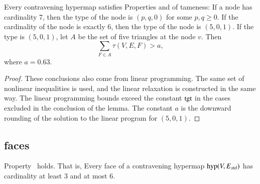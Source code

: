 \begin{lemma}\label{lemma:degE}
Every contravening hypermap satisfies Properties  and 
of tameness: 
If a node has cardinality $7$, then the type of the
       node is $(p,q,0)$ for some $p,q\ge0$.   If the
        cardinality of the node is exactly $6$, then the type of the node
        is $(5,0,1)$.
If the type is $(5,0,1)$, let $A$ be the set of five triangles at the
node $v$.  Then
%
%
$$
\sum_{F\in A} \tau(V,E,F) > a,
$$
where $a=0.63$.
\end{lemma}



\begin{proof} These conclusions also come from linear programming.
The same set of nonlinear inequalities is used, and the linear
relaxation is constructed in the same way.  The linear programming
bounds exceed the constant ${\operatorname{tgt}}$ in the cases excluded in the conclusion
of the lemma.  The constant $a$ is the downward rounding of the solution to the linear program for $(5,0,1)$.
\end{proof}
%

%

\subsection{faces}



\begin{lemma}  \label{lemma:face-size}
Property~ holds.  That is,
Every face of a contravening hypermap ${\operatorname{hyp}}(V,E_{std})$ has cardinality at least $3$ and at most $6$.
\end{lemma}

